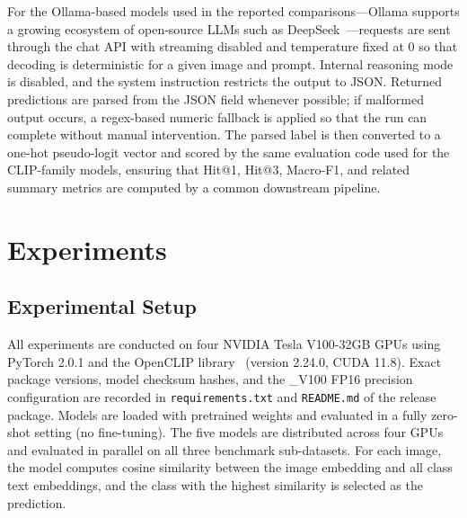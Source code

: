 \documentclass[symmetry,article,submit,pdftex,moreauthors]{Definitions/mdpi}
\begin{document}
For the Ollama-based models used in the reported comparisons—Ollama supports a growing ecosystem of open-source LLMs such as DeepSeek~\cite{deng2025deepseek}—requests are sent through the chat API with streaming disabled and temperature fixed at 0 so that decoding is deterministic for a given image and prompt. Internal reasoning mode is disabled, and the system instruction restricts the output to JSON. Returned predictions are parsed from the JSON field whenever possible; if malformed output occurs, a regex-based numeric fallback is applied so that the run can complete without manual intervention. The parsed label is then converted to a one-hot pseudo-logit vector and scored by the same evaluation code used for the CLIP-family models, ensuring that Hit@1, Hit@3, Macro-F1, and related summary metrics are computed by a common downstream pipeline.


\section{Experiments}
\label{sec:experiments}

\subsection{Experimental Setup}

All experiments are conducted on four NVIDIA Tesla V100-32GB GPUs using PyTorch 2.0.1 and the OpenCLIP library~\cite{cherti2023reproducible} (version 2.24.0, CUDA 11.8). Exact package versions, model checksum hashes, and the \_V100 FP16 precision configuration are recorded in \texttt{requirements.txt} and \texttt{README.md} of the release package.
Models are loaded with pretrained weights and evaluated in a fully zero-shot setting (no fine-tuning).
The five models are distributed across four GPUs and evaluated in parallel on all three benchmark sub-datasets.
For each image, the model computes cosine similarity between the image embedding and all class text embeddings, and the class with the highest similarity is selected as the prediction.
\end{document}
